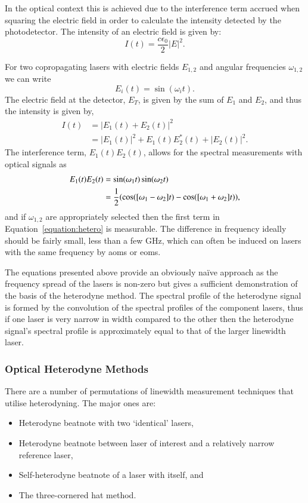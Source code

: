 In the optical context this is achieved due to the interference term accrued when squaring the electric field in order to calculate the intensity detected by the photodetector. The intensity of an electric field is given by:
\begin{equation}
I(t) = \frac{c\epsilon_0}{2}|E|^2.
\end{equation}

For two copropagating lasers with electric fields $E_{1, 2}$ and angular frequencies $\omega_{1, 2}$ we can write
\begin{equation}
E_{i}(t) = \sin(\omega_{i}t).
\end{equation}
The electric field at the detector, $E_T$, is given by the sum of $E_{1}$ and $E_{2}$, and thus the intensity is given by,
\begin{align}
I(t) &= |E_1(t) + E_2(t)|^2\nonumber\\
&= |E_1(t)|^2 + E_1(t)E_2^*(t) + |E_2(t)|^2.
\end{align}
The interference term, $E_1(t)E_2(t)$, allows for the spectral measurements with optical signals as
\begin{align}
E_1(t)E_2(t) &= \sin(\omega_1 t) \sin(\omega_2 t) \notag \\
&= \frac{1}{2} (\cos([\omega_1-\omega_2]t) - \cos([\omega_1+\omega_2]t)), \label{equation:hetero}
\end{align}
and if $\omega_{1,2}$ are appropriately selected then the first term in Equation~\ref{equation:hetero} is measurable.
The difference in frequency ideally should be fairly small, less than a few GHz, which can often be induced on lasers with the same frequency by \glspl{aom} or \glspl{eom}.

The equations presented above provide an obviously na\"ive approach as the frequency spread of the lasers is non-zero but gives a sufficient demonstration of the basis of the heterodyne method.
The spectral profile of the heterodyne signal is formed by the convolution of the spectral profiles of the component lasers, thus if one laser is very narrow in width compared to the other then the heterodyne signal's spectral profile is approximately equal to that of the larger linewidth laser.

\subsubsection{Optical Heterodyne Methods}

There are a number of permutations of linewidth measurement techniques that utilise heterodyning. The major ones are:
\begin{itemize}
\item Heterodyne beatnote with two `identical' lasers,
\item Heterodyne beatnote between laser of interest and a relatively narrow reference laser,
\item Self-heterodyne beatnote of a laser with itself, and
\item The three-cornered hat method.
\end{itemize}


